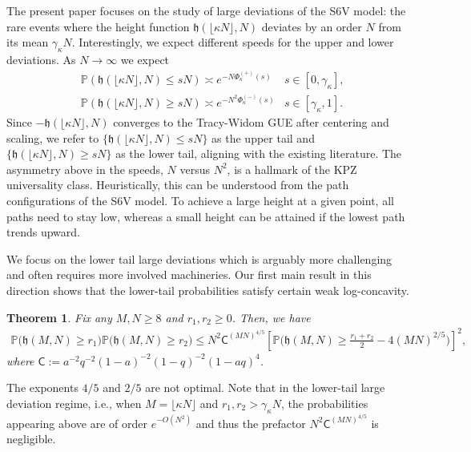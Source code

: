 \documentclass[reqno,11pt]{amsart}
\newcommand{\h}{\mathfrak{h}}
\newcommand{\aw}{a}
\renewcommand{\Pr}{\mathbb{P}}
\newcommand{\lln}{\gamma_\kappa}
\numberwithin{equation}{section}
\newtheorem{theorem}[proposition]{Theorem}
\theoremstyle{definition}
\begin{document}
The present paper focuses on the study of large deviations of the S6V model: the rare events where the height function 
$\h(\lfloor\kappa N\rfloor,N)$ deviates by an order $N$ from its mean $\lln N$. Interestingly, we expect different speeds for the upper and lower deviations. As $N\to \infty$ we expect
\begin{align}\tag{Upper Tail}
   & \Pr(\h(\lfloor\kappa N\rfloor,N) \le sN) \asymp e^{-N\Phi_\kappa^{(+)}(s)} & s\in [0,\lln], \\ \tag{Lower Tail} 
    & \Pr(\h(\lfloor\kappa N\rfloor,N) \ge sN) \asymp e^{-N^2\Phi_\kappa^{(-)}(s)} & s\in [\lln,1].
\end{align}
Since $-\h(\lfloor\kappa N\rfloor,N)$ converges to the Tracy-Widom GUE after centering and scaling, we refer to $\{\h(\lfloor\kappa N\rfloor,N) \le sN\}$ as the upper tail and $\{\h(\lfloor\kappa N\rfloor,N) \ge sN\}$ as the lower tail, aligning with the existing literature. The asymmetry above in the speeds, $N$ versus $N^2$, is a hallmark of the KPZ universality class.  Heuristically, this can be understood from the path configurations of the S6V model. To achieve a large height at a given point, all paths need to stay low, whereas a small height can be attained if the lowest path trends upward.

We focus on the lower tail large deviations which is arguably more challenging and often requires more involved machineries. Our first main result in this direction shows that the lower-tail probabilities satisfy certain weak log-concavity.

\begin{theorem}\label{t.main0}
    Fix any $M,N \ge 8$ and $r_1, r_2\ge 0$. Then, we have
    \begin{align} \label{eq:weaklcasepbdintro}
        \Pr\big(\h(M,N) \ge  r_1\big)\Pr\big(\h(M,N) \ge  r_2\big) \le N^2\mathsf{C}^{(MN)^{4/5}} \left[\Pr\Big(\h(M,N) \ge \frac{r_1+r_2}{2}-4(MN)^{2/5}\Big)\right]^2,
    \end{align}
    where $\mathsf{C}:=\aw^{-2}q^{-2}(1-\aw)^{-2}(1-q)^{-2}(1-\aw q)^{4}$.
\end{theorem}

The exponents $4/5$ and $2/5$ are not optimal. Note that in the lower-tail large deviation regime, i.e., when $M=\lfloor \kappa N\rfloor$ and $r_1,r_2>\lln N$, the probabilities appearing above are of order $e^{-O(N^2)}$ and thus the prefactor $N^2\mathsf{C}^{(MN)^{4/5}}$ is negligible. 

\medskip
\end{document}
